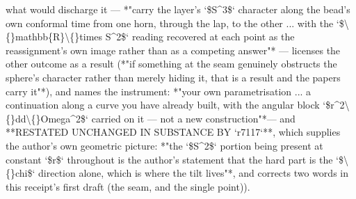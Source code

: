 \begin{description}
what would discharge it --- *"carry the layer's `\$S\textasciicircum{}3\$` character along the bead's own conformal time from one horn, through the lap, to the other ... with the `\$\textbackslash\{\}mathbb\{R\}\textbackslash\{\}times S\textasciicircum{}2\$` reading recovered at each point as the reassignment's own image rather than as a competing answer"* --- licenses the other outcome as a result (*"if something at the seam genuinely obstructs the sphere's character rather than merely hiding it, that is a result and the papers carry it"*), and names the instrument: *"your own parametrisation ... a continuation along a curve you have already built, with the angular block `\$r\textasciicircum{}2\textbackslash\{\}dd\textbackslash\{\}Omega\textasciicircum{}2\$` carried on it --- not a new construction"*--- and **RESTATED UNCHANGED IN SUBSTANCE BY `r7117`**, which supplies the author's own geometric picture: *"the `\$S\textasciicircum{}2\$` portion being present at constant `\$r\$` throughout is the author's statement that the hard part is the `\$\textbackslash\{\}chi\$` direction alone, which is where the tilt lives"*, and corrects two words in this receipt's first draft (the seam, and the single point)). 

\end{description}
